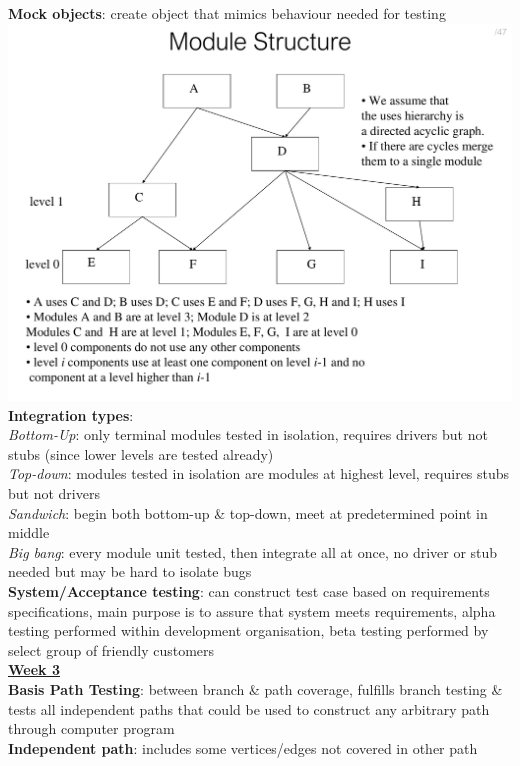 \documentclass[a4paper]{article}
\begin{document}
\begin{multicols}{3}
        \textbf{Mock objects}: create object that mimics behaviour needed for testing\\
        \includegraphics[width=\linewidth]{102.pdf}\\
        \textbf{Integration types}:\\
        \textit{Bottom-Up}: only terminal modules tested in isolation, requires drivers but not stubs (since lower levels are tested already)\\
        \textit{Top-down}: modules tested in isolation are modules at highest level, requires stubs but not drivers\\
        \textit{Sandwich}: begin both bottom-up \& top-down, meet at predetermined point in middle\\
        \textit{Big bang}: every module unit tested, then integrate all at once, no driver or stub needed but may be hard to isolate bugs\\
        \textbf{System/Acceptance testing}: can construct test case based on requirements specifications, main purpose is to assure that system meets requirements, alpha testing performed within development organisation, beta testing performed by select group of friendly customers\\
        \underline{\textbf{Week 3}}\\
        \textbf{Basis Path Testing}: between branch \& path coverage, fulfills branch testing \& tests all independent paths that could be used to construct any arbitrary path through computer program\\
        \textbf{Independent path}: includes some vertices/edges not covered in other path\\

\end{multicols}
\end{document}
